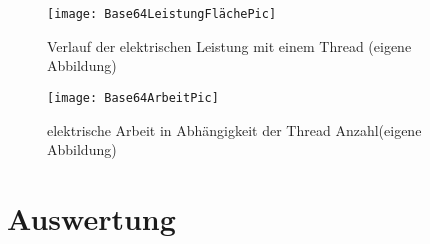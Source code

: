 

\begin{figure}[H]
	\begin{center}	 
	\texttt{[image: Base64LeistungFlächePic]}
	\caption{Verlauf der elektrischen Leistung mit einem Thread (eigene Abbildung)}
	\label{fig:Base64LeistungFlächePic} 
	\end{center}
\end{figure}

\begin{figure}[H]
	\begin{center}	 
	\texttt{[image: Base64ArbeitPic]}
	\caption{elektrische Arbeit in Abhängigkeit der Thread Anzahl(eigene Abbildung)}
	\label{fig:Base64ArbeitPic} 
	\end{center}
\end{figure}


\section{Auswertung}